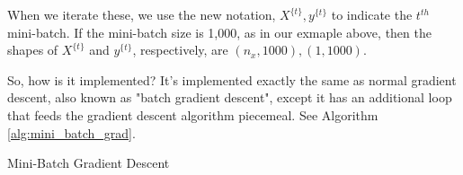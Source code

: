 \documentclass{article}
\begin{document}
When we iterate these, we use the new notation, $X^{\{t\}}, y^{\{t\}}$ to indicate the $t^{th}$ mini-batch.  If the mini-batch size is 1,000, as in our exmaple above, then the shapes of $X^{\{t\}}$ and $y^{\{t\}}$, respectively, are $(n_x, 1000), (1, 1000)$.

So, how is it implemented?  It's implemented exactly the same as normal gradient descent, also known as "batch gradient descent", except it has an additional loop that feeds the gradient descent algorithm piecemeal.  See Algorithm \ref{alg:mini_batch_grad}.

\begin{algorithm}[h]
\label{alg:mini_batch_grad}
\caption{Mini-Batch Gradient Descent}
\end{algorithm}
\end{document}
